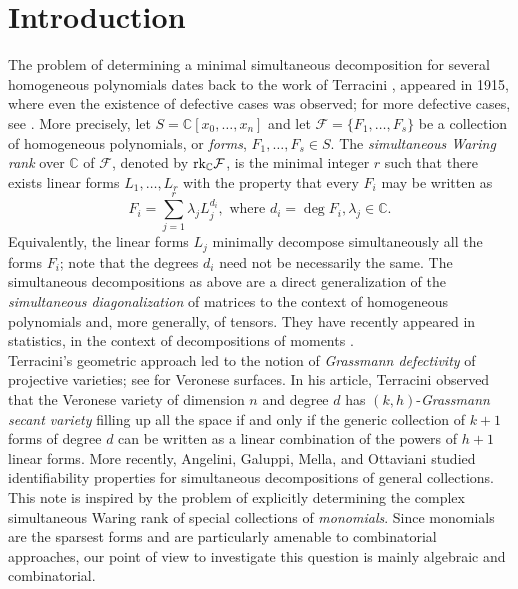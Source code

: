 \documentclass{amsart}
\theoremstyle{plain}
\theoremstyle{definition}
\theoremstyle{remark}
\begin{document}
\section{Introduction}
\indent The problem of determining a minimal simultaneous decomposition for several homogeneous polynomials dates back to the work of Terracini \cite{Terr}, appeared in 1915, where even the existence of defective cases was observed; for more defective cases, see \cite{CC2003}. More precisely, let $S=\mathbb C[x_0,\ldots,x_n]$ and let $\mathcal F = \lbrace F_1,\ldots,F_s\rbrace$ be a collection of homogeneous polynomials, or {\it forms}, $F_1,\ldots, F_s \in S$.
The {\it simultaneous Waring rank} over $\mathbb C$ of $\mathcal F$, denoted by $\textnormal{rk}_{\mathbb C} \mathcal F$, is
the minimal integer $r$ such that there exists linear forms $L_1,\ldots, L_r$ with the property that every $F_i$ may be written as
$$
F_i = \sum_{j=1}^r \lambda_j L_j^{d_i}, \mbox{ where } d_i = \deg F_i, \lambda_j \in \mathbb C.
$$
\noindent Equivalently, the linear forms $L_j$ minimally decompose simultaneously all the forms $F_i$; note that the degrees $d_i$ need not be necessarily the same. The simultaneous decompositions as above are a direct generalization of the {\it simultaneous diagonalization} of matrices to the context of homogeneous polynomials and, more generally, of tensors. They have recently appeared in statistics, in the context of decompositions of moments \cite[Section 3]{AGHKT}. \\
\indent Terracini's geometric approach led to the notion of {\it Grassmann defectivity} of projective varieties; see \cite[Definition 1.1]{DF} for Veronese surfaces. In his article, Terracini observed that the Veronese variety of dimension $n$ and degree $d$ has $(k,h)$-{\it Grassmann secant variety} filling up all the space if and only if the generic collection of $k+1$ forms of degree $d$ can be written as a linear combination of the powers of $h+1$ linear forms. More recently, Angelini, Galuppi, Mella, and Ottaviani  \cite{AGMO} studied identifiability properties for simultaneous decompositions of general collections.\\
\indent This note is inspired by the problem of explicitly determining the complex simultaneous Waring rank of  special collections of {\it monomials}. Since monomials are the sparsest forms and are particularly amenable to combinatorial approaches, our point of view to investigate this question is mainly algebraic and combinatorial. \\
\end{document}

